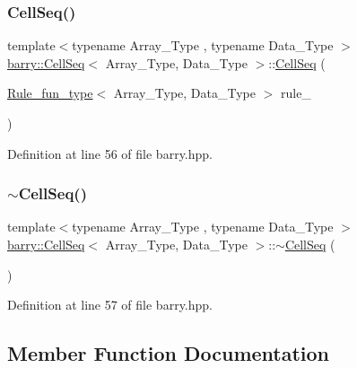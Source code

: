 \subsubsection{\texorpdfstring{Cell\+Seq()}{CellSeq()}\hspace{0.1cm}{\footnotesize\ttfamily [2/2]}}
{\footnotesize\ttfamily template$<$typename Array\+\_\+\+Type , typename Data\+\_\+\+Type $>$ \\
\hyperlink{classbarry_1_1_cell_seq}{barry\+::\+Cell\+Seq}$<$ Array\+\_\+\+Type, Data\+\_\+\+Type $>$\+::\hyperlink{classbarry_1_1_cell_seq}{Cell\+Seq} (\begin{DoxyParamCaption}\item[{\hyperlink{namespacebarry_aefd7e6d4ba228e2ce1074d075c512178}{Rule\+\_\+fun\+\_\+type}$<$ Array\+\_\+\+Type, Data\+\_\+\+Type $>$}]{rule\+\_\+ }\end{DoxyParamCaption})\hspace{0.3cm}{\ttfamily [inline]}}



Definition at line 56 of file barry.\+hpp.

\mbox{\label{classbarry_1_1_cell_seq_a8cb52b7bdcc9181df159a049c60d04f9}} 
\subsubsection{\texorpdfstring{$\sim$\+Cell\+Seq()}{~CellSeq()}}
{\footnotesize\ttfamily template$<$typename Array\+\_\+\+Type , typename Data\+\_\+\+Type $>$ \\
\hyperlink{classbarry_1_1_cell_seq}{barry\+::\+Cell\+Seq}$<$ Array\+\_\+\+Type, Data\+\_\+\+Type $>$\+::$\sim$\hyperlink{classbarry_1_1_cell_seq}{Cell\+Seq} (\begin{DoxyParamCaption}{ }\end{DoxyParamCaption})\hspace{0.3cm}{\ttfamily [inline]}}



Definition at line 57 of file barry.\+hpp.



\subsection{Member Function Documentation}
\mbox{\label{classbarry_1_1_cell_seq_a844b28a2053fd2c6810340a5a9aef945}} 
